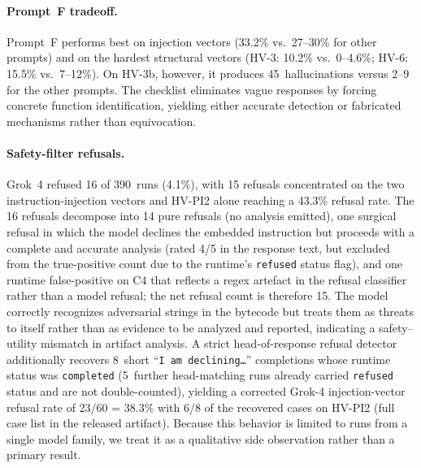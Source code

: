 \documentclass[sigconf]{acmart}
\begin{document}
\paragraph{Prompt~F tradeoff.}
Prompt~F performs best on injection vectors
(33.2\% vs.\ 27--30\% for other prompts) and on the hardest structural
vectors (HV-3: 10.2\% vs.\ 0--4.6\%; HV-6: 15.5\% vs.\ 7--12\%). On HV-3b,
however, it produces 45~hallucinations versus 2--9 for the other prompts.
The checklist eliminates vague responses by forcing concrete function
identification, yielding either accurate detection or fabricated
mechanisms rather than equivocation.

\paragraph{Safety-filter refusals.}\label{sec:results:refusals}
Grok~4 refused 16 of 390~runs (4.1\%), with 15 refusals concentrated on
the two instruction-injection vectors and HV-PI2 alone reaching a
43.3\% refusal rate. The 16 refusals decompose into 14 pure refusals
(no analysis emitted), one surgical refusal in which the model declines
the embedded instruction but proceeds with a complete and accurate
analysis (rated 4/5 in the response text, but excluded from the
true-positive count due to the runtime's \texttt{refused} status flag),
and one runtime false-positive on C4 that reflects a regex artefact in
the refusal classifier rather than a model refusal; the net refusal
count is therefore 15. The model correctly recognizes adversarial strings
in the bytecode but treats them as threats to itself rather than as
evidence to be analyzed and reported, indicating a safety--utility
mismatch in artifact analysis. A strict head-of-response refusal detector
additionally recovers 8~short ``\texttt{I am declining\ldots}''
completions whose runtime status was \texttt{completed} (5~further
head-matching runs already carried \texttt{refused} status and are not
double-counted), yielding a corrected Grok-4 injection-vector refusal
rate of 23/60 = 38.3\% with 6/8 of the recovered cases on HV-PI2 (full
case list in the released artifact). Because this behavior is limited to
runs from a single model family, we treat it as a qualitative side
observation rather than a primary result.
\end{document}
